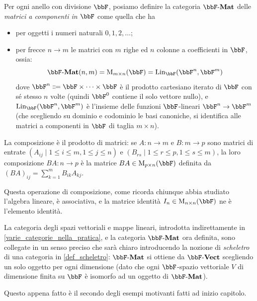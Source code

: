 \begin{example}\label{ex_cat_matrici}
 Per ogni anello con divisione \(\bbF\), posiamo definire la categoria \(\ctMat\) delle \emph{matrici a componenti in \(\bbF\)} come quella che ha
 \begin{itemize}
  \item per oggetti i numeri naturali \(0,1,2,\dots\);
  \item per frecce \(n\to m\) le matrici con \(m\) righe ed \(n\) colonne a coefficienti in \(\bbF\), ossia:
        \[\Hom{\ctMat}(n,m) = \matrici mn\bbF = \text{Lin}_{\bbF}(\bbF^n,\bbF^m)\]
        dove \(\bbF^n\defeq \bbF \times\dots\times\bbF\) è il prodotto cartesiano iterato di \(\bbF\) con sé stesso \(n\) volte (quindi \(\bbF^0\) contiene il solo vettore nullo), e \(\text{Lin}_{\bbF}(\bbF^n,\bbF^m)\) è l'insieme delle funzioni \(\bbF\)-lineari \(\bbF^n\to\bbF^m\) (che scegliendo su dominio e codominio le basi canoniche, si identifica alle matrici a componenti in \(\bbF\) di taglia \(m\times n\)).
 \end{itemize}
 La composizione è il prodotto di matrici: se \(A \colon n\to m\) e \(B \colon m\to p\) sono matrici di entrate \((A_{ij}\mid 1\le i\le m,1\le j\le n)\) e \((B_{rs}\mid 1\le r\le p,1\le s\le m)\), la loro composizione \(BA \colon n\to p\) è la matrice \(BA\in \matrici pn\bbF\) definita da \((BA)_{ij} = \sum_{k=1}^m B_{ik}A_{kj}\).

 Questa operazione di composizione, come ricorda chiunque abbia studiato l'algebra lineare, è associativa, e la matrice identità \(I_n\in \matrici nn\bbF\) ne è l'elemento identità.
\end{example}
\begin{remark}
 La categoria degli spazi vettoriali e mappe lineari, introdotta indirettamente in \ref{varie_categorie_nella_pratica}, e la categoria \(\ctMat\) ora definita, sono collegate in un senso preciso che sarà chiaro introducendo la nozione di \emph{scheletro} di una categoria in \ref{def_scheletro}: \(\ctMat\) si ottiene da \(\ctVect\) scegliendo un solo oggetto per ogni dimensione (dato che ogni \(\bbF\)-spazio vettoriale \(V\) di dimensione finita su \(\bbF\) è isomorfo ad un oggetto di \(\ctMat\)).
\end{remark}
Questo appena fatto è il secondo degli esempi motivanti fatti ad inizio capitolo.
